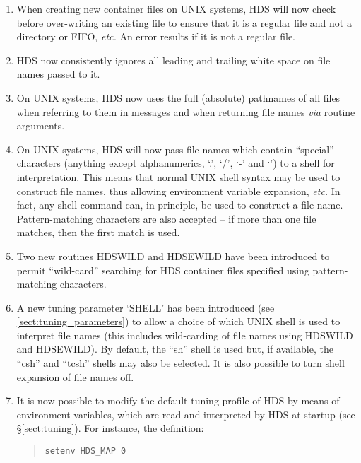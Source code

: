 \documentclass[twoside,11pt]{article}
\newcommand{\htmlref}[2]{#1}
\renewcommand{\_}{\texttt{\symbol{95}}}
\newcommand{\qt}[1]{``#1''}
\newcommand{\st}[1]{{\em{#1}}}
\newcommand{\qt}[1]{{\tt{"}}#1{\tt{"}}}
\begin{document}
\begin{enumerate}
\item
When creating new container files on UNIX systems, HDS will now check
before over-writing an existing file to ensure that it is a regular
file and not a directory or FIFO, \st{etc.} An error results if it is
not a regular file.

\item
HDS now consistently ignores all leading and trailing white space on
file names passed to it.

\item
On UNIX systems, HDS now uses the full (absolute) pathnames of all
files when referring to them in messages and when returning file names
\st{via} routine arguments.

\item
On UNIX systems, HDS will now pass file names which contain
\qt{special} characters (anything except alphanumerics, `.', `/', `-'
and `\_') to a shell for interpretation. This means that normal UNIX
shell syntax may be used to construct file names, thus allowing
environment variable expansion, \st{etc.}  In fact, any shell command
can, in principle, be used to construct a file name.  Pattern-matching
characters are also accepted -- if more than one file matches, then
the first match is used.

\item
Two new routines \htmlref{HDS\_WILD}{HDS_WILD} and
\htmlref{HDS\_EWILD}{HDS_EWILD} have been introduced to permit
\qt{wild-card} searching for HDS container files specified using
pattern-matching characters.

\item
A new tuning parameter `SHELL' has been introduced (see
\ref{sect:tuning_parameters}) to allow a choice of which UNIX shell is
used to interpret file names (this includes wild-carding of file names
using \htmlref{HDS\_WILD}{HDS_WILD} and
\htmlref{HDS\_EWILD}{HDS_EWILD}). By default, the \qt{sh} shell is
used but, if available, the \qt{csh} and \qt{tcsh} shells may also be
selected. It is also possible to turn shell expansion of file names
off.

\item
It is now possible to modify the default tuning profile of HDS by
means of environment variables, which are read and interpreted by HDS
at startup (see \S\ref{sect:tuning}). For instance, the definition:

\small
\begin{quote}
\begin{verbatim}
setenv HDS_MAP 0
\end{verbatim}
\end{quote}
\normalsize


\end{enumerate}
\end{document}
